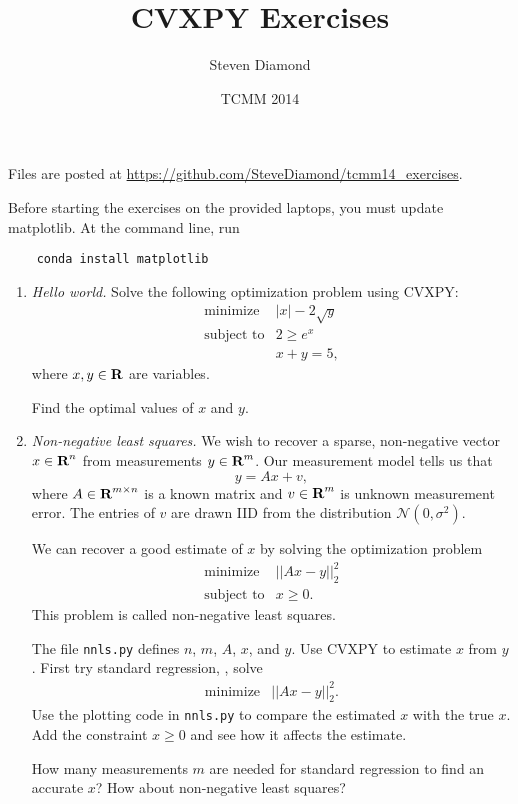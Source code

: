 \documentclass[12pt]{article}
\title{CVXPY Exercises}
\author{Steven Diamond}
\date{TCMM 2014}
\begin{document}
\maketitle

Files are posted at \url{https://github.com/SteveDiamond/tcmm14_exercises}.

Before starting the exercises on the provided laptops, you must update matplotlib. At the command line, run
\begin{verbatim}
    conda install matplotlib
\end{verbatim}

\begin{enumerate}
\item\emph{Hello world.}
Solve the following optimization problem using CVXPY:
\[
\begin{array}{ll} \mbox{minimize} & |x| - 2\sqrt{y}\\
\mbox{subject to} & 2 \geq e^x \\
& x + y = 5,
\end{array}
\]
where $x,y \in {\mbox{\bf R}}$ are variables.

Find the optimal values of $x$ and $y$.

\item\emph{Non-negative least squares.}
We wish to recover a sparse, non-negative vector $x \in {\mbox{\bf R}}^n$ from measurements $y \in {\mbox{\bf R}}^m$. Our measurement model tells us that
$$
y = Ax + v,
$$
where $A \in {\mbox{\bf R}}^{m \times n}$ is a known matrix and $v \in {\mbox{\bf R}}^m$ is unknown measurement error. The entries of $v$ are drawn IID from the distribution $\mathcal{N}(0, \sigma^2)$.

We can recover a good estimate of $x$ by solving the optimization problem
\[
\begin{array}{ll} \mbox{minimize} & ||Ax - y||^2_2\\
\mbox{subject to} & x \geq 0.
\end{array}
\]
This problem is called non-negative least squares.

The file \verb+nnls.py+ defines $n$, $m$, $A$, $x$, and $y$. Use CVXPY to estimate $x$ from $y$. First try standard regression, \ie, solve
\[
\begin{array}{ll} \mbox{minimize} & ||Ax - y||^2_2.
\end{array}
\]
Use the plotting code in \verb+nnls.py+ to compare the estimated $x$ with the true $x$. Add the constraint $x \geq 0$ and see how it affects the estimate.

How many measurements $m$ are needed for standard regression to find an accurate $x$? How about non-negative least squares?


\end{enumerate}
\end{document}

